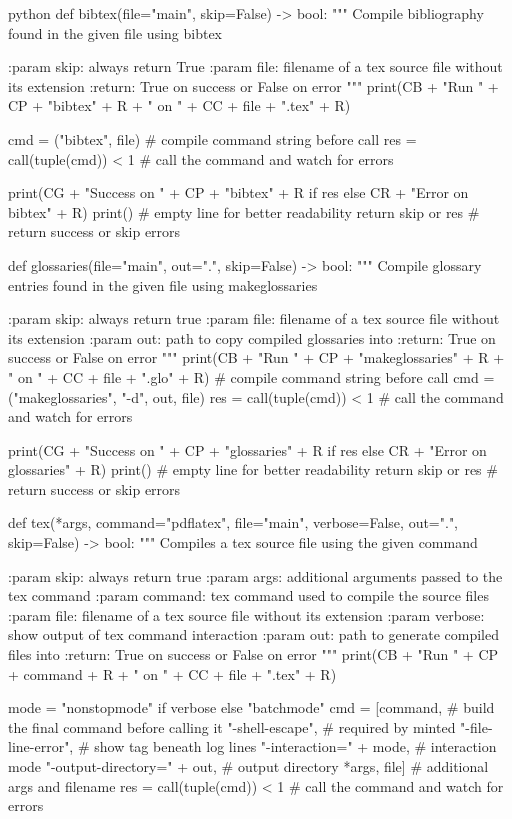 \documentclass[minted]{protocol}
\begin{document}
\begin{code}{python}
def bibtex(file="main", skip=False) -> bool:
    """
    Compile bibliography found in the given file using bibtex

    :param skip: always return True
    :param file: filename of a tex source file without its extension
    :return: True on success or False on error
    """
    print(CB + "Run " + CP + "bibtex" + R + " on " + CC + file + ".tex" + R)

    cmd = ("bibtex", file)      # compile command string before call
    res = call(tuple(cmd)) < 1  # call the command and watch for errors

    print(CG + "Success on " + CP + "bibtex" + R if res else CR + "Error on bibtex" + R)
    print()                     # empty line for better readability
    return skip or res          # return success or skip errors


def glossaries(file="main", out=".", skip=False) -> bool:
    """
    Compile glossary entries found in the given file using makeglossaries

    :param skip: always return true
    :param file: filename of a tex source file without its extension
    :param out: path to copy compiled glossaries into
    :return: True on success or False on error
    """
    print(CB + "Run " + CP + "makeglossaries" + R + " on " + CC + file + ".glo" + R)
    # compile command string before call
    cmd = ("makeglossaries", "-d", out, file)
    res = call(tuple(cmd)) < 1  # call the command and watch for errors

    print(CG + "Success on " + CP + "glossaries" + R if res else CR + "Error on glossaries" + R)
    print()                     # empty line for better readability
    return skip or res          # return success or skip errors


def tex(*args, command="pdflatex", file="main", verbose=False, out=".", skip=False) -> bool:
    """
    Compiles a tex source file using the given command

    :param skip: always return true
    :param args: additional arguments passed to the tex command
    :param command: tex command used to compile the source files
    :param file: filename of a tex source file without its extension
    :param verbose: show output of tex command interaction
    :param out: path to generate compiled files into
    :return: True on success or False on error
    """
    print(CB + "Run " + CP + command + R + " on " + CC + file + ".tex" + R)

    mode = "nonstopmode" if verbose else "batchmode"
    cmd = [command,                     # build the final command before calling it
           "-shell-escape",             # required by minted
           "-file-line-error",          # show tag beneath log lines
           "-interaction=" + mode,      # interaction mode
           "-output-directory=" + out,  # output directory
           *args, file]                 # additional args and filename
    res = call(tuple(cmd)) < 1          # call the command and watch for errors


\end{code}
\end{document}

